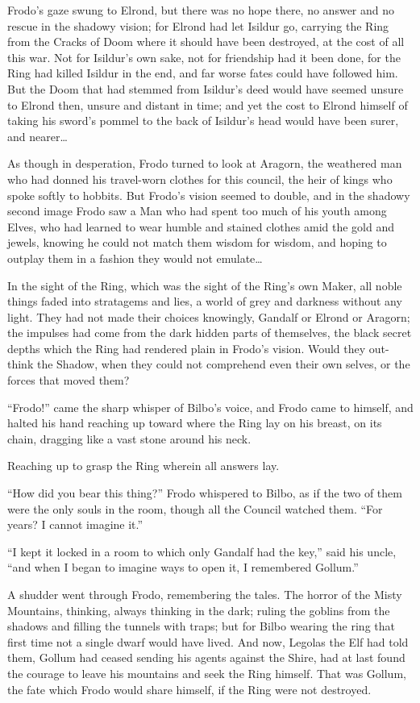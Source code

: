 Frodo’s gaze swung to Elrond, but there was no hope there, no answer and no rescue in the shadowy vision; for Elrond had let Isildur go, carrying the Ring from the Cracks of Doom where it should have been destroyed, at the cost of all this war. Not for Isildur’s own sake, not for friendship had it been done, for the Ring had killed Isildur in the end, and far worse fates could have followed him. But the Doom that had stemmed from Isildur’s deed would have seemed unsure to Elrond then, unsure and distant in time; and yet the cost to Elrond himself of taking his sword’s pommel to the back of Isildur’s head would have been surer, and nearer…

As though in desperation, Frodo turned to look at Aragorn, the weathered man who had donned his travel-worn clothes for this council, the heir of kings who spoke softly to hobbits. But Frodo’s vision seemed to double, and in the shadowy second image Frodo saw a Man who had spent too much of his youth among Elves, who had learned to wear humble and stained clothes amid the gold and jewels, knowing he could not match them wisdom for wisdom, and hoping to outplay them in a fashion they would not emulate…

In the sight of the Ring, which was the sight of the Ring’s own Maker, all noble things faded into stratagems and lies, a world of grey and darkness without any light. They had not made their choices knowingly, Gandalf or Elrond or Aragorn; the impulses had come from the dark hidden parts of themselves, the black secret depths which the Ring had rendered plain in Frodo’s vision. Would they out-think the Shadow, when they could not comprehend even their own selves, or the forces that moved them?

“Frodo!” came the sharp whisper of Bilbo’s voice, and Frodo came to himself, and halted his hand reaching up toward where the Ring lay on his breast, on its chain, dragging like a vast stone around his neck.

Reaching up to grasp the Ring wherein all answers lay.

“How did you bear this thing?” Frodo whispered to Bilbo, as if the two of them were the only souls in the room, though all the Council watched them. “For years? I cannot imagine it.”

“I kept it locked in a room to which only Gandalf had the key,” said his uncle, “and when I began to imagine ways to open it, I remembered Gollum.”

A shudder went through Frodo, remembering the tales. The horror of the Misty Mountains, thinking, always thinking in the dark; ruling the goblins from the shadows and filling the tunnels with traps; but for Bilbo wearing the ring that first time not a single dwarf would have lived. And now, Legolas the Elf had told them, Gollum had ceased sending his agents against the Shire, had at last found the courage to leave his mountains and seek the Ring himself. That was Gollum, the fate which Frodo would share himself, if the Ring were not destroyed.


